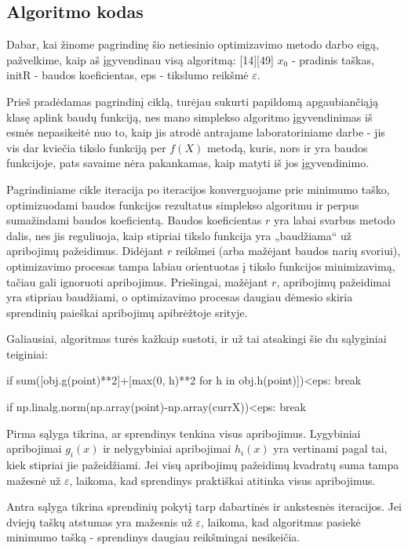 \documentclass{article}
\begin{document}
\subsection{Algoritmo kodas}
Dabar, kai žinome pagrindinę šio netiesinio optimizavimo metodo darbo eigą, pažvelkime, kaip aš įgyvendinau visą algoritmą:
[14][49]
$x_{0}$ - pradinis taškas, initR - baudos koeficientas, eps - tikslumo reikšmė $\varepsilon$. 

Prieš pradėdamas pagrindinį ciklą, turėjau sukurti papildomą apgaubiančiąją klasę aplink baudų funkciją, nes mano simplekso algoritmo įgyvendinimas iš esmės nepasikeitė nuo to, kaip jis atrodė antrajame laboratoriniame darbe - jis vis dar kviečia tikslo funkciją per $f(X)$ metodą, kuris, nors ir yra baudos funkcijoje, pats savaime nėra pakankamas, kaip matyti iš jos įgyvendinimo.

Pagrindiniame cikle iteracija po iteracijos konverguojame prie minimumo taško, optimizuodami baudos funkcijos rezultatus simplekso algoritmu ir perpus sumažindami baudos koeficientą. Baudos koeficientas $r$ yra labai svarbus metodo dalis, nes jis reguliuoja, kaip stipriai tikslo funkcija yra „baudžiama“ už apribojimų pažeidimus. Didėjant $r$ reikšmei (arba mažėjant baudos narių svoriui), optimizavimo procesas tampa labiau orientuotas į tikslo funkcijos minimizavimą, tačiau gali ignoruoti apribojimus. Priešingai, mažėjant $r$, apribojimų pažeidimai yra stipriau baudžiami, o optimizavimo procesas daugiau dėmesio skiria sprendinių paieškai apribojimų apibrėžtoje srityje. 

Galiausiai, algoritmas turės kažkaip sustoti, ir už tai atsakingi šie du sąlyginiai teiginiai:
\begin{python}
    if sum([obj.g(point)**2]+[max(0, h)**2 for h in obj.h(point)])<eps:
        break

    if np.linalg.norm(np.array(point)-np.array(currX))<eps:
        break
\end{python}
Pirma sąlyga tikrina, ar sprendinys tenkina visus apribojimus. Lygybiniai apribojimai $g_{i}(x)$ ir nelygybiniai apribojimai $h_{i}(x)$ yra vertinami pagal tai, kiek stipriai jie pažeidžiami. Jei visų apribojimų pažeidimų kvadratų suma tampa mažesnė už $\varepsilon$, laikoma, kad sprendinys praktiškai atitinka visus apribojimus. 

Antra sąlyga tikrina sprendinių pokytį tarp dabartinės ir ankstesnės iteracijos. Jei dviejų taškų atstumas yra mažesnis už $\varepsilon$, laikoma, kad algoritmas pasiekė minimumo tašką - sprendinys daugiau reikšmingai nesikeičia.
\end{document}
